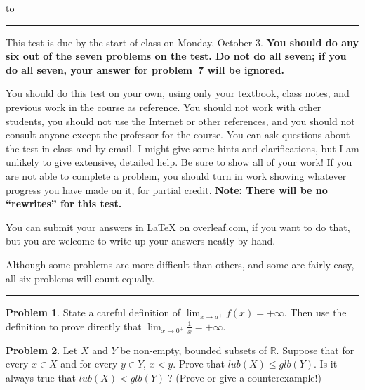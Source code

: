 \documentclass[12pt]{article}
\newcommand{\R}{{\mathbb R}}
\theoremstyle{definition}
\newtheorem{problem}{Problem}
\newenvironment{answer}{\par\medskip\bgroup\color{darkblue}}{\egroup\par\medskip}
\begin{document}
\hbox to 
\nointerlineskip
\vskip 3pt
\hrule height 1pt

\medskip

{\narrower\narrower\small{
This test is due by the start of class on Monday, October 3.  
\textbf{You should do any six out of the seven problems on the test.  Do not do
all seven; if you do all seven, your answer for problem~7 will be ignored.}\par
You should do this test on your own, using only your textbook, class notes, 
and previous work in the course as reference.  You should
not work with other students, you should not use the Internet or other references, and you should not
consult anyone except the professor for the course.  You can ask questions about the test in class and by email.
I might give some hints and clarifications, but I am unlikely to give
extensive, detailed help.   Be sure to show all of
your work!  If you are not able to complete a problem, you should turn in work showing
whatever progress you have made on it, for partial credit.
\textbf{Note: There will be no ``rewrites'' for this test.}\par
You can submit your answers in LaTeX on overleaf.com, if you want to do 
that, but you are welcome to write up your answers neatly by hand.\par
Although some problems are more difficult than others, and some are fairly easy, 
all six problems will count equally.}
\par}

\medskip
\hrule height 1pt
\bigskip


\def\ds{\displaystyle}


\begin{problem} %
State a careful definition of $\ds\lim_{x\to a^+}f(x)=+\infty$.  Then use the definition to
prove directly that $\ds\lim_{x\to 0^+}\frac{1}{x} = +\infty$.
\end{problem}

\begin{answer}
\end{answer}





\begin{problem}  %
Let $X$ and $Y$ be non-empty, bounded subsets of $\R$.  Suppose that for every $x\in X$ and 
for every $y\in Y$, $x<y$.  Prove that $lub(X)\le glb(Y)$.  Is it always true that
$lub(X)<glb(Y)\;$? (Prove or give a counterexample!)
\end{problem}
\end{document}
